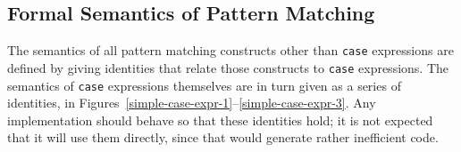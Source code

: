 \subsection{Formal Semantics of Pattern Matching}
\label{case-semantics}

The semantics of all pattern matching constructs other than \mbox{\tt case}
expressions are defined by giving identities that relate those
constructs to \mbox{\tt case} expressions.  The semantics of
\mbox{\tt case} expressions themselves are in turn given as a series of
identities, in Figures~\ref{simple-case-expr-1}--\ref{simple-case-expr-3}. 
Any implementation should behave so that these identities hold; it is 
not expected that it will use them directly, since that 
would generate rather inefficient code.
  
\begin{figure}[tb]
\end{figure}

